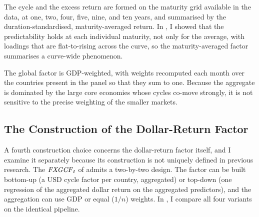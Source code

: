 The cycle and the excess return are formed on the maturity grid available in
the data, at one, two, four, five, nine, and ten years, and summarised by the
duration-standardised, maturity-averaged return. In , I showed that the predictability
holds at each individual maturity, not only for the average, with loadings that
are flat-to-rising across the curve, so the maturity-averaged factor summarises
a curve-wide phenomenon.

The global factor is GDP-weighted, with weights recomputed each
month over the countries present in the panel so that they sum to one. Because the
aggregate is dominated by the large core economies whose cycles co-move
strongly, it is not sensitive to the precise weighting of the smaller
markets.

\begin{table}[t]
  \caption{Sensitivity of the cycle factor to the trend parameters $v$ and $M$}
  \label{tab:rob-vm-sens}
  \centering
  
\end{table}

\subsection*{The Construction of the Dollar-Return Factor}
\label{sec:rob-fxgcf-construction}

A fourth construction choice concerns the dollar-return factor itself, and I
examine it separately because its construction is not uniquely defined in
previous research. The
$\mathit{FXGCF}_{t}$ of  admits a two-by-two design. The factor can
be built bottom-up (a USD cycle factor per country, aggregated) or top-down
(one regression of the aggregated dollar return on the aggregated
predictors), and the aggregation can use GDP or equal ($1/n$) weights. In
, I compare all four variants on the
identical pipeline.

\begin{table}[t]
  \caption{The dollar-return factor under alternative constructions}
  \label{tab:rob-fxgcf-construction}
  \centering
  
\end{table}

